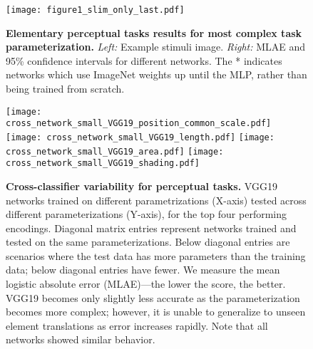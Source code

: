 \begin{figure}[p]
	\centering
	\texttt{[image: figure1\_slim\_only\_last.pdf]}
	\caption{\textbf{Elementary perceptual tasks results for most complex task parameterization.} \emph{Left:} Example stimuli image. \emph{Right:} MLAE and 95\% confidence intervals for different networks. The * indicates networks which use ImageNet weights up until the MLP, rather than being trained from scratch.}
	\label{fig:figure1_results}
\end{figure}


\begin{figure}[p]
	\centering
	  \texttt{[image: cross\_network\_small\_VGG19\_position\_common\_scale.pdf]}
	  \texttt{[image: cross\_network\_small\_VGG19\_length.pdf]}
	  \texttt{[image: cross\_network\_small\_VGG19\_area.pdf]}
	  \texttt{[image: cross\_network\_small\_VGG19\_shading.pdf]}
  \caption{\textbf{Cross-classifier variability for perceptual tasks.} VGG19 networks trained on different parametrizations (X-axis) tested across different parameterizations (Y-axis), for the top four performing encodings. Diagonal matrix entries represent networks trained and tested on the same parameterizations. Below diagonal entries are scenarios where the test data has more parameters than the training data; below diagonal entries have fewer. We measure the mean logistic absolute error (MLAE)---the lower the score, the better. VGG19 becomes only slightly less accurate as the parameterization becomes more complex; however, it is unable to generalize to unseen element translations as error increases rapidly. Note that all networks showed similar behavior.}
	\label{fig:cross_network}
\end{figure}

